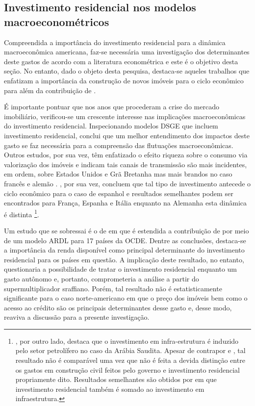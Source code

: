 \subsection{Investimento residencial nos modelos macroeconométricos}\label{RevEmpirica}

Compreendida a importância do investimento residencial para a dinâmica macroeconômica americana, faz-se necessária uma investigação dos determinantes deste gastos de acordo com a literatura econométrica e este é o objetivo desta seção. 
No entanto, dado o objeto desta pesquisa, destaca-se aqueles trabalhos que enfatizam a importância da construção de novos imóveis para o ciclo econômico para além da contribuição de \textcite{leamer_housing_2007}.


É importante pontuar que nos anos que procederam a crise do mercado imobiliário, verificou-se um crescente interesse nas implicações macroeconômicas do investimento residencial. Inspecionando modelos DSGE que incluem investimento residencial, \textcite{iacoviello_housing_2010} conclui que um melhor entendimento dos impactos deste gasto se faz necessária para a compreensão das flutuações macroeconômicas. Outros estudos, por sua vez, têm enfatizado o efeito riqueza sobre o consumo via valorização dos imóveis e indicam tais canais de transmissão são mais incidentes, em ordem, sobre Estados Unidos e Grã Bretanha mas mais brandos no caso francês e alemão \cites{sastre_assessment_2010}{chauvin_wealth_2010}{bassanetti_effects_2010}{arrondel_housing_2010}. 
\textcite{alvarez_does_2010}, por sua vez, concluem que tal tipo de investimento antecede o ciclo econômico para o caso de espanhol e resultados semelhantes podem ser encontrados para França, Espanha  e Itália enquanto na Alemanha esta dinâmica é distinta \cites{ferrara_common_2010}{ferrara_cyclical_2010}{ferrara_common_2010}\footnote{\textcite{alhowaish_causality_2015}, por outro lado, destaca que o investimento em infra-estrutura é induzido pelo setor petrolífero no caso da Arábia Saudita. Apesar de contrapor \textcite{green_follow_1997}  e \textcite{leamer_housing_2007}, tal resultado não é comparável uma vez que não é feita a devida distinção entre os gastos em construção civil feitos pelo governo e investimento residencial propriamente dito. Resultados semelhantes são obtidos por \textcite{ofori_testing_2003} em que investimento residencial também é somado ao investimento em infraestrutura.}. 

Um estudo que se sobressai é o de \textcite{arestis_residential_2015} em que é estendida a contribuição de \textcite{poterba_tax_1984} por meio de um modelo ARDL para 17 países da OCDE. Dentre as conclusões, destaca-se a importância da renda disponível como principal determinante do investimento residencial para os países em questão.  A implicação deste resultado, no entanto, questionaria a possibilidade de tratar o investimento residencial enquanto um gasto autônomo e, portanto, comprometeria a análise a partir do supermultiplicador sraffiano. Porém, tal resultado não é estatisticamente significante para o caso norte-americano em que o preço dos imóveis bem como o acesso ao crédito são os principais determinantes desse gasto e, desse modo, reaviva a discussão para a presente investigação.



